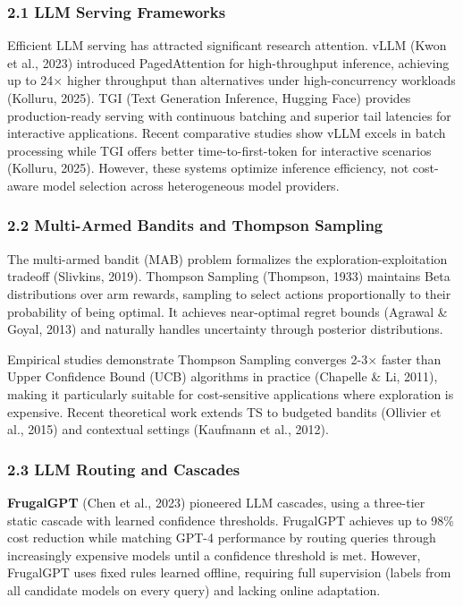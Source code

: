 \documentclass[
  11pt,
]{article}
\begin{document}
\hypertarget{llm-serving-frameworks}{%
\subsubsection{2.1 LLM Serving
Frameworks}\label{llm-serving-frameworks}}

Efficient LLM serving has attracted significant research attention. vLLM
(Kwon et al., 2023) introduced PagedAttention for high-throughput
inference, achieving up to 24× higher throughput than alternatives under
high-concurrency workloads (Kolluru, 2025). TGI (Text Generation
Inference, Hugging Face) provides production-ready serving with
continuous batching and superior tail latencies for interactive
applications. Recent comparative studies show vLLM excels in batch
processing while TGI offers better time-to-first-token for interactive
scenarios (Kolluru, 2025). However, these systems optimize inference
efficiency, not cost-aware model selection across heterogeneous model
providers.

\hypertarget{multi-armed-bandits-and-thompson-sampling}{%
\subsubsection{2.2 Multi-Armed Bandits and Thompson
Sampling}\label{multi-armed-bandits-and-thompson-sampling}}

The multi-armed bandit (MAB) problem formalizes the
exploration-exploitation tradeoff (Slivkins, 2019). Thompson Sampling
(Thompson, 1933) maintains Beta distributions over arm rewards, sampling
to select actions proportionally to their probability of being optimal.
It achieves near-optimal regret bounds (Agrawal \& Goyal, 2013) and
naturally handles uncertainty through posterior distributions.

Empirical studies demonstrate Thompson Sampling converges 2-3× faster
than Upper Confidence Bound (UCB) algorithms in practice (Chapelle \&
Li, 2011), making it particularly suitable for cost-sensitive
applications where exploration is expensive. Recent theoretical work
extends TS to budgeted bandits (Ollivier et al., 2015) and contextual
settings (Kaufmann et al., 2012).

\hypertarget{llm-routing-and-cascades}{%
\subsubsection{2.3 LLM Routing and
Cascades}\label{llm-routing-and-cascades}}

\textbf{FrugalGPT} (Chen et al., 2023) pioneered LLM cascades, using a
three-tier static cascade with learned confidence thresholds. FrugalGPT
achieves up to 98\% cost reduction while matching GPT-4 performance by
routing queries through increasingly expensive models until a confidence
threshold is met. However, FrugalGPT uses fixed rules learned offline,
requiring full supervision (labels from all candidate models on every
query) and lacking online adaptation.
\end{document}
